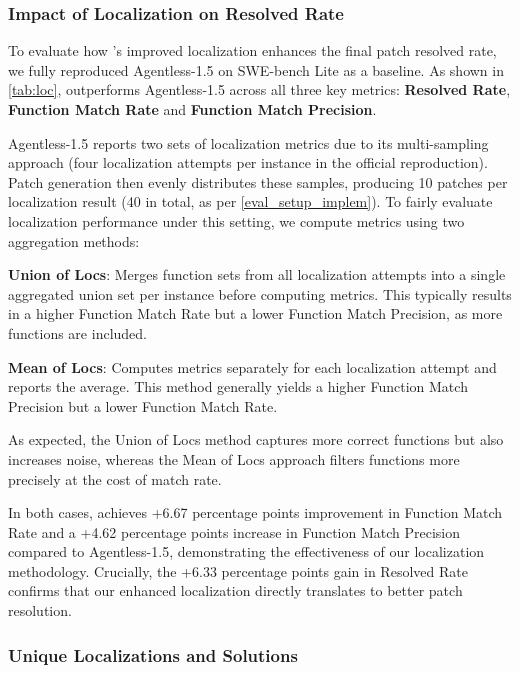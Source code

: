 \subsubsection{Impact of Localization on Resolved Rate}

To evaluate how \nickname’s improved localization enhances the final patch resolved rate, we fully reproduced Agentless-1.5 \cite{xia2024agentless} on SWE-bench Lite as a baseline. As shown in \cref{tab:loc}, \nickname outperforms Agentless-1.5 across all three key metrics: \textbf{Resolved Rate}, \textbf{Function Match Rate} and \textbf{Function Match Precision}.

Agentless-1.5 reports two sets of localization metrics due to its multi-sampling approach (four localization attempts per instance in the official reproduction). Patch generation then evenly distributes these samples, producing 10 patches per localization result (40 in total, as per \cref{eval_setup_implem}). To fairly evaluate localization performance under this setting, we compute metrics using two aggregation methods:

\squishlist

\item \textbf{Union of Locs}: Merges function sets from all localization attempts into a single aggregated union set per instance before computing metrics. This typically results in a higher Function Match Rate but a lower Function Match Precision, as more functions are included.

\item \textbf{Mean of Locs}: Computes metrics separately for each localization attempt and reports the average. This method generally yields a higher Function Match Precision but a lower Function Match Rate.

\squishend

As expected, the Union of Locs method captures more correct functions but also increases noise, whereas the Mean of Locs approach filters functions more precisely at the cost of match rate.

In both cases, \nickname achieves +6.67 percentage points improvement in Function Match Rate and a +4.62 percentage points increase in Function Match Precision compared to Agentless-1.5, demonstrating the effectiveness of our localization methodology. Crucially, the +6.33 percentage points gain in Resolved Rate confirms that our enhanced localization directly translates to better patch resolution.

\subsubsection{Unique Localizations and Solutions}

